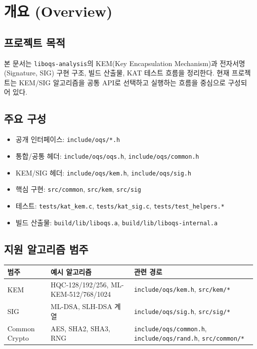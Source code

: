\section{개요 (Overview)}

\subsection{프로젝트 목적}
본 문서는 \texttt{liboqs-analysis}의 KEM(Key Encapsulation Mechanism)과 전자서명(Signature, SIG) 구현 구조,
빌드 산출물, KAT 테스트 흐름을 정리한다.
현재 프로젝트는 KEM/SIG 알고리즘을 공통 API로 선택하고 실행하는 흐름을 중심으로 구성되어 있다.

\subsection{주요 구성}
\begin{itemize}[leftmargin=*]
\item 공개 인터페이스: \texttt{include/oqs/*.h}
\item 통합/공통 헤더: \texttt{include/oqs/oqs.h}, \texttt{include/oqs/common.h}
\item KEM/SIG 헤더: \texttt{include/oqs/kem.h}, \texttt{include/oqs/sig.h}
\item 핵심 구현: \texttt{src/common}, \texttt{src/kem}, \texttt{src/sig}
\item 테스트: \texttt{tests/kat\_kem.c}, \texttt{tests/kat\_sig.c}, \texttt{tests/test\_helpers.*}
\item 빌드 산출물: \texttt{build/lib/liboqs.a}, \texttt{build/lib/liboqs-internal.a}
\end{itemize}

\subsection{지원 알고리즘 범주}
\begin{table}[h!]
\centering
\begin{tabular}{p{}p{}p{}}
\toprule
범주 & 예시 알고리즘 & 관련 경로 \\
\midrule
KEM & HQC-128/192/256, ML-KEM-512/768/1024 & \texttt{include/oqs/kem.h}, \texttt{src/kem/*} \\
SIG & ML-DSA, SLH-DSA 계열 & \texttt{include/oqs/sig.h}, \texttt{src/sig/*} \\
Common Crypto & AES, SHA2, SHA3, RNG & \texttt{include/oqs/common.h}, \texttt{include/oqs/rand.h}, \texttt{src/common/*} \\
\bottomrule
\end{tabular}
\end{table}

